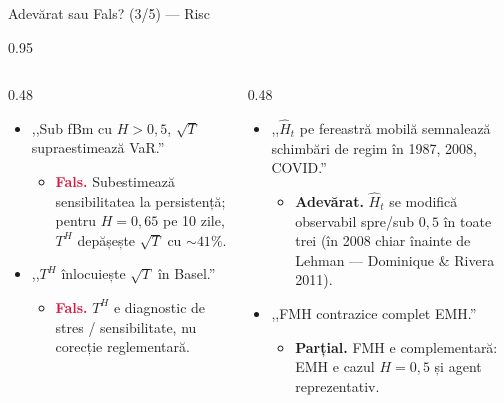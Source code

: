 \documentclass[9pt, aspectratio=169, t]{beamer}
\begin{document}
\begin{frame}[shrink=15]{Adevărat sau Fals? (3/5) --- Risc}
\begin{cminipage}{0.95\textwidth}
\begin{columns}[T]
\begin{column}{0.48\textwidth}
\begin{itemize}\setlength{\itemsep}{2pt}
    \item ,,Sub fBm cu $H>0{,}5$, $\sqrt T$ supraestimează VaR.''
    \begin{itemize}\setlength{\itemsep}{0pt}
        \item[] \textcolor{Crimson}{\textbf{Fals.}} Subestimează sensibilitatea la persistență; pentru $H=0{,}65$ pe 10 zile, $T^H$ depășește $\sqrt T$ cu $\sim 41\%$.
    \end{itemize}
    \item ,,$T^H$ înlocuiește $\sqrt T$ în Basel.''
    \begin{itemize}\setlength{\itemsep}{0pt}
        \item[] \textcolor{Crimson}{\textbf{Fals.}} $T^H$ e diagnostic de stres / sensibilitate, nu corecție reglementară.
    \end{itemize}
\end{itemize}
\end{column}
\begin{column}{0.48\textwidth}
\begin{itemize}\setlength{\itemsep}{2pt}
    \item ,,$\hat H_t$ pe fereastră mobilă semnalează schimbări de regim în 1987, 2008, COVID.''
    \begin{itemize}\setlength{\itemsep}{0pt}
        \item[] \textcolor{Forest}{\textbf{Adevărat.}} $\hat H_t$ se modifică observabil spre/sub $0{,}5$ în toate trei (în 2008 chiar înainte de Lehman --- Dominique \& Rivera 2011).
    \end{itemize}
    \item ,,FMH contrazice complet EMH.''
    \begin{itemize}\setlength{\itemsep}{0pt}
        \item[] \textcolor{Amber}{\textbf{Parțial.}} FMH e complementară: EMH e cazul $H=0{,}5$ și agent reprezentativ.
    \end{itemize}
\end{itemize}
\end{column}
\end{columns}
\end{cminipage}
\end{frame}
\end{document}
